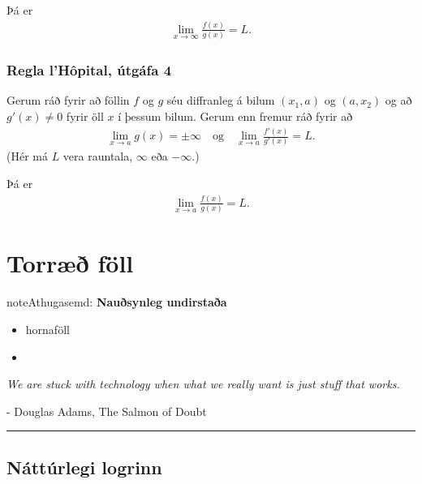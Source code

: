 \documentclass[a4paper,10pt,icelandic]{sphinxmanual}
\begin{document}
Þá er
\begin{equation*}
\begin{split}\lim_{x\rightarrow \infty}\frac{f(x)}{g(x)}=L.\end{split}
\end{equation*}

\subsection{Regla l’Hôpital, útgáfa 4}
\label{kafli03:regla-lhopital-utgafa-4}
Gerum ráð fyrir að föllin \(f\) og \(g\) séu diffranleg á bilum
\((x_1, a)\) og \((a, x_2)\) og að \(g'(x)\neq 0\) fyrir öll
\(x\) í þessum bilum. Gerum enn fremur ráð fyrir að
\begin{equation*}
\begin{split}\lim_{x\rightarrow a}g(x)=\pm\infty
\quad\mbox{og}\quad \lim_{x\rightarrow a}\frac{f'(x)}{g'(x)}=L.\end{split}
\end{equation*}
(Hér má \(L\) vera rauntala, \(\infty\) eða \(-\infty\).)

Þá er
\begin{equation*}
\begin{split}\lim_{x\rightarrow a}\frac{f(x)}{g(x)}=L.\end{split}
\end{equation*}

\chapter{Torræð föll}
\label{kafli04:torrae-foll}\label{kafli04::doc}
\begin{notice}{note}{Athugasemd:}
\textbf{Nauðsynleg undirstaða}
\begin{itemize}
\item {} 
hornaföll

\item {} 
{\hyperref[kafli01:andhverfa]{}}

\end{itemize}
\end{notice}

\emph{We are stuck with technology when what we really want is just stuff that works.}

- Douglas Adams, The Salmon of Doubt


\bigskip\hrule{}\bigskip



\section{Náttúrlegi logrinn}
\label{kafli04:natturlegi-logrinn}
\end{document}
